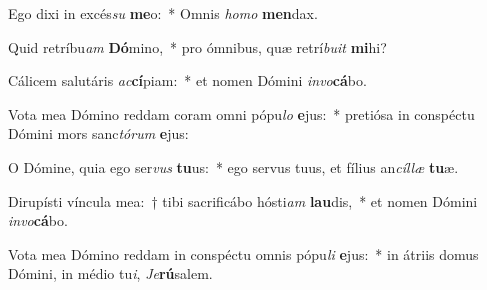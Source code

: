 \item Ego dixi in excés\textit{su} \textbf{me}o:~* Omnis \textit{ho}\textit{mo} \textbf{men}dax.
\item Quid retríbu\textit{am} \textbf{Dó}mino,~* pro ómnibus, quæ retrí\textit{bu}\textit{it} \textbf{mi}hi?
\item Cálicem salutáris \textit{ac}\textbf{cí}piam:~* et nomen Dómini \textit{in}\textit{vo}\textbf{cá}bo.
\item Vota mea Dómino reddam coram omni pópu\textit{lo} \textbf{e}jus:~* pretiósa in conspéctu Dómini mors sanc\textit{tó}\textit{rum} \textbf{e}jus:
\item O Dómine, quia ego ser\textit{vus} \textbf{tu}us:~* ego servus tuus, et fílius an\textit{cíl}\textit{læ} \textbf{tu}æ.
\item Dirupísti víncula mea:~† tibi sacrificábo hósti\textit{am} \textbf{lau}dis,~* et nomen Dómini \textit{in}\textit{vo}\textbf{cá}bo.
\item Vota mea Dómino reddam in conspéctu omnis pópu\textit{li} \textbf{e}jus:~* in átriis domus Dómini, in médio tu\textit{i}, \textit{Je}\textbf{rú}salem.
